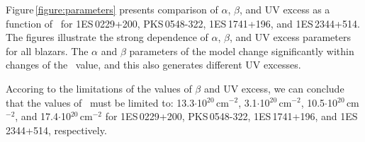Figure\,\ref{figure:parameters}   presents comparison of $\alpha$,   $\beta$, and UV excess as a function of  \nh\  for 1ES\,0229+200, PKS\,0548-322, 1ES\,1741+196, and 1ES\,2344+514.
The figures illustrate the strong dependence of $\alpha$,   $\beta$, and UV excess parameters for all blazars. 
The $\alpha$ and $\beta$ parameters of the model change significantly within changes of the \nh\ value, and this also generates different UV excesses.  

Accoring to the limitations of the values of $\beta$ and UV excess, we can conclude that the values of \nh\ must be limited to:
 13.3$\cdot$10$^{20}$\,cm$^{-2}$, 3.1$\cdot$10$^{20}$\,cm$^{-2}$, 10.5$\cdot$10$^{20}$\,cm$^{-2}$, and 17.4$\cdot$10$^{20}$\,cm$^{-2}$ for 1ES\,0229+200, PKS\,0548-322, 1ES\,1741+196, and 1ES\,2344+514, respectively. 

 

\begin{figure*}
   \\
   \\
\caption[]{Comparison of model parameters: $\alpha$ (top panel), $\beta$ (middle panel), and UV excess (bottom panel) as a function of \nh\ value for 
1ES\,0229+200, PKS\,0548-322, 1ES\,1741+196, 1ES\,2344+514. }
\label{figure:parameters}
\end{figure*}




\noindent
